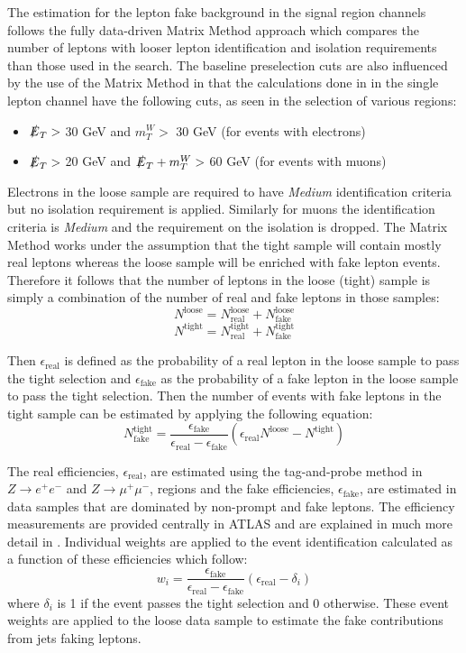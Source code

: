 The estimation for the lepton fake background in the signal region channels follows the fully data-driven Matrix Method\cite{MatrixMethod} approach which compares the number of leptons with looser lepton identification and isolation requirements than those used in the search. The baseline preselection cuts are also influenced by the use of the Matrix Method in that the calculations done in \cite{MatrixMethod} in the single lepton channel have the following cuts, as seen in the selection of various regions:
\begin{itemize}
\item $\slashed{E}_T >$ 30 GeV and $m_T^W >$ 30 GeV (for events with electrons)
\item $\slashed{E}_T >$ 20 GeV and $\slashed{E}_T + m_T^W >$ 60 GeV (for events with muons)
\end{itemize}
Electrons in the loose sample are required to have \textit{Medium} identification criteria but no isolation requirement is applied.  Similarly for muons the identification criteria is \textit{Medium} and the requirement on the isolation is dropped.  The Matrix Method works under the assumption that the tight sample will contain mostly real leptons whereas the loose sample will be enriched with fake lepton events.  Therefore it follows that the number of leptons in the loose (tight) sample is simply a combination of the number of real and fake leptons in those samples:
\[
N^{\text{loose}} = N^{\text{loose}}_\text{real} +N^{\text{loose}}_\text{fake} \]
\[
N^{\text{tight}} = N^{\text{tight}}_\text{real} +N^{\text{tight}}_\text{fake} \]

Then $\epsilon_\text{real}$ is defined as the probability of a real lepton in the loose sample to pass the tight selection and $\epsilon_\text{fake}$ as the probability of a fake lepton in the loose sample to pass the tight selection.  Then the number of events with fake leptons in the tight sample can be estimated by applying the following equation:
\[  N_\text{fake}^\text{tight} = \frac{\epsilon_\text{fake}}{\epsilon_\text{real}-\epsilon_\text{fake}}(\epsilon_\text{real} N^\text{loose} -N^\text{tight})
\]

The real efficiencies, $\epsilon_\text{real}$, are estimated using the tag-and-probe method in $Z\rightarrow e^+ e^-$ and $Z\rightarrow \mu^+ \mu^-$, regions and the fake efficiencies, $\epsilon_\text{fake}$, are estimated in data samples that are dominated by non-prompt and fake leptons.  The efficiency measurements are provided centrally in ATLAS and are explained in much more detail in \cite{MatrixMethod}.  Individual weights are applied to the event identification calculated as a function of these efficiencies which follow:
\[ w_i = \frac{\epsilon_\text{fake}}{\epsilon_\text{real}-\epsilon_\text{fake}}(\epsilon_\text{real}-\delta_i) \]
where $\delta_i$ is 1 if the event passes the tight selection and 0 otherwise.  These event weights are applied to the loose data sample to estimate the fake contributions from jets faking leptons.

